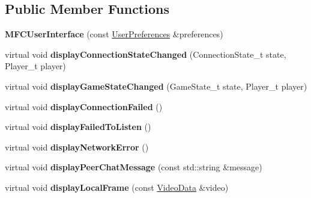 \subsection*{Public Member Functions}
\begin{DoxyCompactItemize}
\item 
\hypertarget{classMFCUserInterface_a7ac72f8cddb94419db9c9ed261ace1b1}{
{\bfseries MFCUserInterface} (const \hyperlink{structUserPreferences}{UserPreferences} \&preferences)}
\label{classMFCUserInterface_a7ac72f8cddb94419db9c9ed261ace1b1}

\item 
\hypertarget{classMFCUserInterface_affc39ae32cd234575ce95db40701db01}{
virtual void {\bfseries displayConnectionStateChanged} (ConnectionState\_\-t state, Player\_\-t player)}
\label{classMFCUserInterface_affc39ae32cd234575ce95db40701db01}

\item 
\hypertarget{classMFCUserInterface_a5cf1751505da89dc55df1fb12318bd96}{
virtual void {\bfseries displayGameStateChanged} (GameState\_\-t state, Player\_\-t player)}
\label{classMFCUserInterface_a5cf1751505da89dc55df1fb12318bd96}

\item 
\hypertarget{classMFCUserInterface_a1eb12e6f9b8729361008d9abd290d245}{
virtual void {\bfseries displayConnectionFailed} ()}
\label{classMFCUserInterface_a1eb12e6f9b8729361008d9abd290d245}

\item 
\hypertarget{classMFCUserInterface_a1ad6e96350df96d07b0f4de186c1677c}{
virtual void {\bfseries displayFailedToListen} ()}
\label{classMFCUserInterface_a1ad6e96350df96d07b0f4de186c1677c}

\item 
\hypertarget{classMFCUserInterface_a12aafbe2449d1eff42150b84e2b403b2}{
virtual void {\bfseries displayNetworkError} ()}
\label{classMFCUserInterface_a12aafbe2449d1eff42150b84e2b403b2}

\item 
\hypertarget{classMFCUserInterface_a211917cb2e10228e4cabd54d5b411106}{
virtual void {\bfseries displayPeerChatMessage} (const std::string \&message)}
\label{classMFCUserInterface_a211917cb2e10228e4cabd54d5b411106}

\item 
\hypertarget{classMFCUserInterface_a93930bcf41087f4f1c0380f12b190714}{
virtual void {\bfseries displayLocalFrame} (const \hyperlink{structVideoData}{VideoData} \&video)}
\label{classMFCUserInterface_a93930bcf41087f4f1c0380f12b190714}


\end{DoxyCompactItemize}
